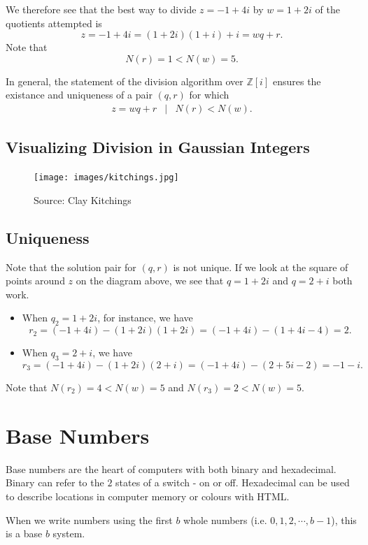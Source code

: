 We therefore see that the best way to divide $z=-1+4i$ by $w=1+2i$ of the quotients attempted is $$z=-1+4i=(1+2i)(1+i)+i=wq+r.$$  Note that $$N(r)=1<N(w)=5.$$  

In general, the statement of the division algorithm over $\mathbb{Z}[i]$ ensures the existance and uniqueness of a pair $(q,r)$ for which  \begin{eqnarray*} z=wq+r &|& N(r)<N(w). \end{eqnarray*} 

\subsection{Visualizing Division in Gaussian Integers}

\begin{figure}[H]
	\centering\texttt{[image: images/kitchings.jpg]}
	\caption{Source:  Clay Kitchings \cite{div:1}}
\end{figure}

\subsection{Uniqueness} 

Note that the solution pair for $(q,r)$ is not unique. If we look at the square of points around $z$ on the diagram above, we see that $q=1+2i$ and $q=2+i$ both work.
\begin{itemize}
	\item When $q_2=1+2i$, for instance, we have $$r_2=(-1+4i)-\left(1+2i\right)\left(1+2i\right)=(-1+4i)-\left(1+4i-4\right)=2.$$
	\item When $q_3=2+i$, we have $$r_3=(-1+4i)-\left(1+2i\right)\left(2+i\right)=(-1+4i)-(2+5i-2)=-1-i.$$
\end{itemize}
Note that $N(r_2)=4<N(w)=5$ and $N(r_3)=2<N(w)=5$.

\clearpage

\section{Base Numbers}

Base numbers are the heart of computers with both binary and hexadecimal. Binary can refer to the $2$ states of a switch - on or off. Hexadecimal can be used to describe locations in computer memory or colours with HTML.  

\begin{defi} When we write numbers using the first $b$ whole numbers (i.e. $0, 1, 2, \cdots, b-1$), this is a base $b$ system.  \cite{aops:1} \end{defi}


